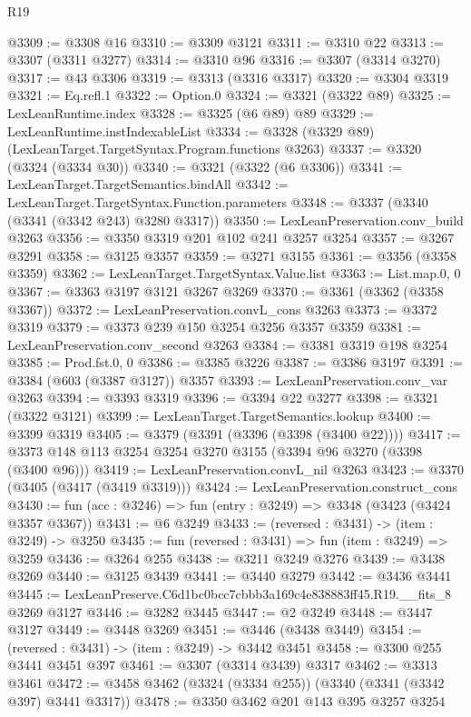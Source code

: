 \begin{lexlean}{R19}
\begin{coremodule}
@3309 := @3308 @16
@3310 := @3309 @3121
@3311 := @3310 @22
@3313 := @3307 (@3311 @3277)
@3314 := @3310 @96
@3316 := @3307 (@3314 @3270)
@3317 := @43 @3306
@3319 := @3313 (@3316 @3317)
@3320 := @3304 @3319
@3321 := Eq.refl.{1}
@3322 := Option.{0}
@3324 := @3321 (@3322 @89)
@3325 := LexLeanRuntime.index
@3328 := @3325 (@6 @89) @89
@3329 := LexLeanRuntime.instIndexableList
@3334 := @3328 (@3329 @89) (LexLeanTarget.TargetSyntax.Program.functions @3263)
@3337 := @3320 (@3324 (@3334 @30))
@3340 := @3321 (@3322 (@6 @3306))
@3341 := LexLeanTarget.TargetSemantics.bindAll
@3342 := LexLeanTarget.TargetSyntax.Function.parameters
@3348 := @3337 (@3340 (@3341 (@3342 @243) @3280 @3317))
@3350 := LexLeanPreservation.conv_build @3263
@3356 := @3350 @3319 @201 @102 @241 @3257 @3254
@3357 := @3267 @3291
@3358 := @3125 @3357
@3359 := @3271 @3155
@3361 := @3356 (@3358 @3359)
@3362 := LexLeanTarget.TargetSyntax.Value.list
@3363 := List.map.{0, 0}
@3367 := @3363 @3197 @3121 @3267 @3269
@3370 := @3361 (@3362 (@3358 @3367))
@3372 := LexLeanPreservation.convL_cons @3263
@3373 := @3372 @3319
@3379 := @3373 @239 @150 @3254 @3256 @3357 @3359
@3381 := LexLeanPreservation.conv_second @3263
@3384 := @3381 @3319 @198 @3254
@3385 := Prod.fst.{0, 0}
@3386 := @3385 @3226
@3387 := @3386 @3197
@3391 := @3384 (@603 (@3387 @3127)) @3357
@3393 := LexLeanPreservation.conv_var @3263
@3394 := @3393 @3319
@3396 := @3394 @22 @3277
@3398 := @3321 (@3322 @3121)
@3399 := LexLeanTarget.TargetSemantics.lookup
@3400 := @3399 @3319
@3405 := @3379 (@3391 (@3396 (@3398 (@3400 @22))))
@3417 := @3373 @148 @113 @3254 @3254 @3270 @3155 (@3394 @96 @3270 (@3398 (@3400 @96)))
@3419 := LexLeanPreservation.convL_nil @3263
@3423 := @3370 (@3405 (@3417 (@3419 @3319)))
@3424 := LexLeanPreservation.construct_cons
@3430 := fun (acc : @3246) => fun (entry : @3249) => @3348 (@3423 (@3424 @3357 @3367))
@3431 := @6 @3249
@3433 := (reversed : @3431) -> (item : @3249) -> @3250
@3435 := fun (reversed : @3431) => fun (item : @3249) => @3259
@3436 := @3264 @255
@3438 := @3211 @3249 @3276
@3439 := @3438 @3269
@3440 := @3125 @3439
@3441 := @3440 @3279
@3442 := @3436 @3441
@3445 := LexLeanPreserve.C6d1bc0bcc7cbbb3a169c4e838883ff45.R19.__fits_8 @3269 @3127
@3446 := @3282 @3445
@3447 := @2 @3249
@3448 := @3447 @3127
@3449 := @3448 @3269
@3451 := @3446 (@3438 @3449)
@3454 := (reversed : @3431) -> (item : @3249) -> @3442 @3451
@3458 := @3300 @255 @3441 @3451 @397
@3461 := @3307 (@3314 @3439) @3317
@3462 := @3313 @3461
@3472 := @3458 @3462 (@3324 (@3334 @255)) (@3340 (@3341 (@3342 @397) @3441 @3317))
@3478 := @3350 @3462 @201 @143 @395 @3257 @3254

\end{coremodule}
\end{lexlean}

